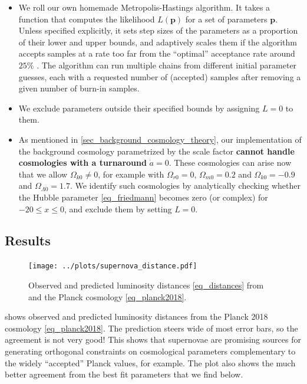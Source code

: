 \documentclass[10pt,a4paper]{article}
\begin{document}
\begin{itemize}
	\item We roll our own homemade Metropolis-Hastings algorithm.
	      It takes a function that computes the likelihood $L(\mathbf{p})$ for a set of parameters $\mathbf{p}$.
	      Unless specified explicitly, it sets step sizes of the parameters as a proportion of their lower and upper bounds,
		  and adaptively scales them if the algorithm accepts samples at a rate too far from the ``optimal'' acceptance rate around $25\%$ \cite{gelmanWeakConvergenceOptimal1997}.
		  The algorithm can run multiple chains from different initial parameter guesses,
		  each with a requested number of (accepted) samples after removing a given number of burn-in samples.
	\item We exclude parameters outside their specified bounds by assigning $L=0$ to them.
	\item As mentioned in \cref{sec_background_cosmology_theory},
	      our implementation of the background cosmology parametrized by the scale factor
	      \textbf{cannot handle cosmologies with a turnaround} $\dot{a} = 0$.
	      These cosmologies can arise now that we allow $\Omega_{k0} \neq 0$,
	      for example with $\Omega_{r0}=0$, $\Omega_{m0} = 0.2$ and $\Omega_{k0} = -0.9$ and $\Omega_{\Lambda0} = 1.7$.
	      We identify such cosmologies by analytically checking whether the Hubble parameter \eqref{eq_friedmann} becomes zero (or complex) for $-20 \leq x \leq 0$,
	      and exclude them by setting $L=0$.
\end{itemize}

\subsection{Results}

\begin{figure}[!b]
	\centering
	\texttt{[image: ../plots/supernova\_distance.pdf]}
	\caption{Observed and predicted luminosity distances \eqref{eq_distances} from \cite{betouleImprovedCosmologicalConstraints2014} and the Planck cosmology \eqref{eq_planck2018}.}
	\label{fig_luminosity_distances}
\end{figure}

 shows observed and predicted luminosity distances from the Planck 2018 cosmology \eqref{eq_planck2018}.
The prediction steers wide of most error bars, so the agreement is not very good!
This shows that supernovae are promising sources for generating orthogonal constraints on cosmological parameters complementary to the widely ``accepted'' Planck values, for example.
The plot also shows the much better agreement from the best fit parameters that we find below.
\end{document}
